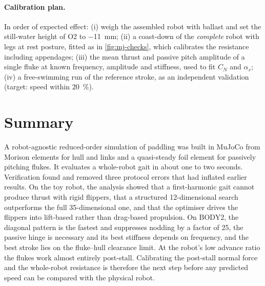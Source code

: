 \paragraph{Calibration plan.}
In order of expected effect: (i) weigh the assembled robot with ballast and set the
still-water height of O2 to \SI{-11}{mm}; (ii) a coast-down of the \emph{complete}
robot with legs at rest posture, fitted as in \cref{fig:mj-checks}, which calibrates the
resistance including appendages; (iii) the mean thrust and passive pitch amplitude of a
single fluke at known frequency, amplitude and stiffness, used to fit $C_N$ and $\alpha_s$;
(iv) a free-swimming run of the reference stroke, as an independent validation (target:
speed within \SI{20}{\percent}).

\section{Summary}
\label{sec:mj-summary}
A robot-agnostic reduced-order simulation of paddling was built in MuJoCo from Morison
elements for hull and links and a quasi-steady foil element for passively pitching
flukes. It evaluates a whole-robot gait in about one to two seconds. Verification found
and removed three protocol errors that had inflated earlier results. On the toy robot,
the analysis showed that a first-harmonic gait cannot produce thrust with rigid
flippers, that a structured 12-dimensional search outperforms the full 35-dimensional
one, and that the optimiser drives the flippers into lift-based rather than drag-based
propulsion. On BODY2, the diagonal pattern is the fastest and suppresses nodding by a
factor of 25, the passive hinge is necessary and its best stiffness depends on
frequency, and the best stroke lies on the fluke--hull clearance limit. At the robot's
low advance ratio the flukes work almost entirely post-stall. Calibrating the
post-stall normal force and the whole-robot resistance is therefore the next step before
any predicted speed can be compared with the physical robot.
